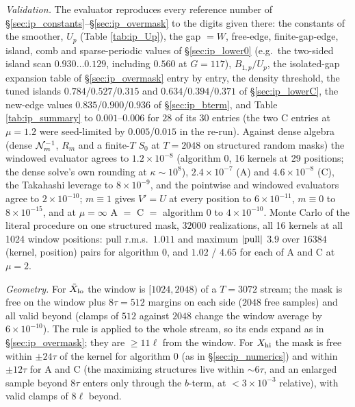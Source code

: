 \documentclass{article}
\numberwithin{equation}{section}   %
\begin{document}
{\em Validation.}  The evaluator reproduces every reference number of
\S\ref{sec:ip_constants}--\S\ref{sec:ip_overmask} to the digits given there: the constants of the
smoother, $U_p$ (Table \ref{tab:ip_Up}), the gap $= W$, free-edge, finite-gap-edge, island, comb and
sparse-periodic values of \S\ref{sec:ip_lower0} (e.g.\ the two-sided island scan $0.930 \ldots 0.129$,
including $0.560$ at $G = 117$), $B_{1,p}/U_p$, the isolated-gap expansion table of \S\ref{sec:ip_overmask}
entry by entry, the density threshold, the tuned islands $0.784$/$0.527$/$0.315$ and $0.634$/$0.394$/$0.371$
of \S\ref{sec:ip_lowerC}, the new-edge values $0.835$/$0.900$/$0.936$ of \S\ref{sec:ip_bterm}, and Table
\ref{tab:ip_summary} to $0.001$--$0.006$ for $28$ of its $30$ entries (the two C entries at $\mu = 1.2$
were seed-limited by $0.005$/$0.015$ in the re-run).  Against dense algebra (dense ${\cal N}_m^{-1}$, $R_m$
and a finite-$T$ $S_0$ at $T = 2048$ on structured random masks) the windowed evaluator agrees to
$1.2 \times 10^{-8}$ (algorithm 0, 16 kernels at 29 positions; the dense solve's own rounding at
$\kappa \sim 10^8$), $2.4 \times 10^{-7}$ (A) and $4.6 \times 10^{-8}$ (C), the Takahashi leverage to
$8 \times 10^{-9}$, and the pointwise and windowed evaluators agree to $2 \times 10^{-10}$; $m \equiv 1$
gives $V' = U$ at every position to $6 \times 10^{-11}$, $m \equiv 0$ to $8 \times 10^{-15}$, and at
$\mu = \infty$ A $=$ C $=$ algorithm 0 to $4 \times 10^{-10}$.  Monte Carlo of the literal procedure on one
structured mask, $32000$ realizations, all 16 kernels at all 1024 window positions: pull r.m.s.\ $1.011$
and maximum $|{\rm pull}|$ $3.9$ over $16384$ (kernel, position) pairs for algorithm 0, and $1.02$ / $4.65$
for each of A and C at $\mu = 2$.

{\em Geometry.}  For $\tilde X_{\rm lo}$ the window is $[1024, 2048)$ of a $T = 3072$ stream; the mask is
free on the window plus $8\tau = 512$ margins on each side ($2048$ free samples) and all valid beyond
(clamps of $512$ against $2048$ change the window average by $6 \times 10^{-10}$).  The rule is applied to
the whole stream, so its ends expand as in \S\ref{sec:ip_overmask}; they are $\ge 11\ell$ from the window.
For $X_{\rm hi}$ the mask is free within $\pm 24\tau$ of the kernel for algorithm 0 (as in
\S\ref{sec:ip_numerics}) and within $\pm 12\tau$ for A and C (the maximizing structures live within
$\sim 6\tau$, and an enlarged sample beyond $8\tau$ enters only through the $b$-term, at
$< 3 \times 10^{-3}$ relative), with valid clamps of $8\ell$ beyond.
\end{document}
